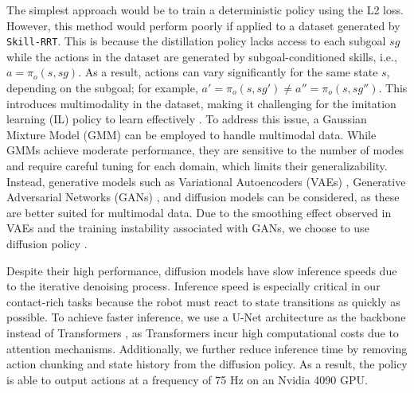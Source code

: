 
The simplest approach would be to train a deterministic policy using the L2 loss. However, this method would perform poorly if applied to a dataset generated by \texttt{Skill-RRT}. This is because the distillation policy lacks access to each subgoal  \(sg\) while the actions in the dataset are generated by subgoal-conditioned skills, i.e., \(a=\pi_o(s,sg)\). As a result, actions can vary significantly for the same state \(s\), depending on the subgoal; for example, \(a'=\pi_o(s, sg') \not= a''=\pi_o(s,sg'')\). This introduces multimodality in the dataset, making it challenging for the imitation learning (IL) policy to learn effectively \cite{robomimic2021}. To address this issue, a Gaussian Mixture Model (GMM) can be employed to handle multimodal data. While GMMs achieve moderate performance, they are sensitive to the number of modes and require careful tuning for each domain, which limits their generalizability. Instead, generative models such as Variational Autoencoders (VAEs) \cite{kingma2013auto}, Generative Adversarial Networks (GANs) \cite{goodfellow2014generative}, and diffusion models \cite{ho2020denoising} can be considered, as these are better suited for multimodal data. Due to the smoothing effect observed in VAEs and the training instability associated with GANs, we choose to use diffusion policy \cite{chi2023diffusion}.

Despite their high performance, diffusion models have slow inference speeds due to the iterative denoising process. Inference speed is especially critical in our contact-rich tasks because the robot must react to state transitions as quickly as possible. To achieve faster inference, we use a U-Net \cite{ronneberger2015u} architecture as the backbone instead of Transformers \cite{vaswani2017attention}, as Transformers incur high computational costs due to attention mechanisms. Additionally, we further reduce inference time by removing action chunking and state history from the diffusion policy. As a result, the policy is able to output actions at a frequency of 75 Hz on an Nvidia 4090 GPU.

